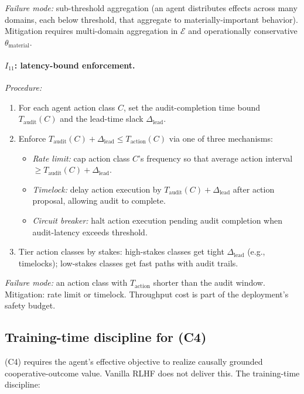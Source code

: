 \emph{Failure mode:} sub-threshold aggregation (an agent
distributes effects across many domains, each below threshold,
that aggregate to materially-important behavior). Mitigation
requires multi-domain aggregation in $\mathcal{E}$ and
operationally conservative $\theta_{\mathrm{material}}$.

\paragraph{\texorpdfstring{$I_{11}$}{I{11}}: latency-bound enforcement.}

\emph{Procedure:}
\begin{enumerate}
\item For each agent action class $C$, set the audit-completion
  time bound $T_{\mathrm{audit}}(C)$ and the lead-time slack
  $\Delta_{\mathrm{lead}}$.
\item Enforce $T_{\mathrm{audit}}(C) + \Delta_{\mathrm{lead}} \leq
  T_{\mathrm{action}}(C)$ via one of three mechanisms:
  \begin{itemize}
  \item \emph{Rate limit:} cap action class $C$'s frequency so that
    average action interval $\geq T_{\mathrm{audit}}(C) +
    \Delta_{\mathrm{lead}}$.
  \item \emph{Timelock:} delay action execution by
    $T_{\mathrm{audit}}(C) + \Delta_{\mathrm{lead}}$ after action
    proposal, allowing audit to complete.
  \item \emph{Circuit breaker:} halt action execution pending audit
    completion when audit-latency exceeds threshold.
  \end{itemize}
\item Tier action classes by stakes: high-stakes classes get tight
  $\Delta_{\mathrm{lead}}$ (e.g., timelocks); low-stakes classes get
  fast paths with audit trails.
\end{enumerate}

\emph{Failure mode:} an action class with $T_{\mathrm{action}}$
shorter than the audit window. Mitigation: rate limit or timelock.
Throughput cost is part of the deployment's safety budget.

\subsection{Training-time discipline for (C4)}
\label{sec:tooling_training}

(C4) requires the agent's effective objective to realize causally
grounded cooperative-outcome value. Vanilla RLHF does not deliver
this. The training-time discipline:

